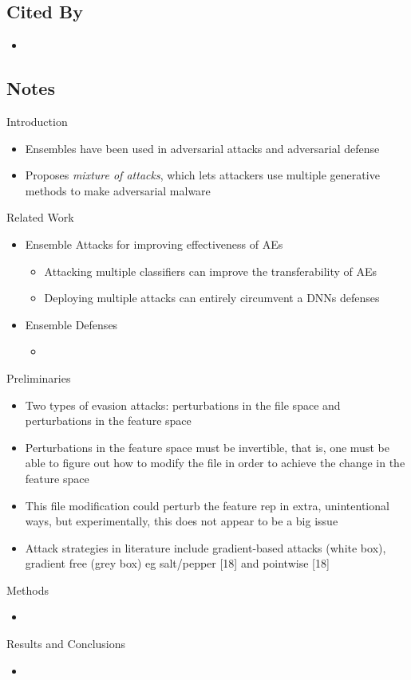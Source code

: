 \documentclass{article}
\begin{document}
\subsection*{Cited By}
\begin{itemize}
\item
\end{itemize}

\subsection*{Notes}

Introduction
\begin{itemize}
\item Ensembles have been used in adversarial attacks and adversarial defense
\item Proposes \textit{mixture of attacks}, which lets attackers use multiple generative methods to make adversarial malware
\end{itemize}
Related Work
\begin{itemize}
\item Ensemble Attacks for improving effectiveness of AEs
	\begin{itemize}
	\item Attacking multiple classifiers can improve the transferability of AEs
	\item Deploying multiple attacks can entirely circumvent a DNNs defenses
	\end{itemize}
\item Ensemble Defenses
	\begin{itemize}
	\item 
	\end{itemize}
\end{itemize}
Preliminaries
\begin{itemize}
\item Two types of evasion attacks: perturbations in the file space and perturbations in the feature space
\item Perturbations in the feature space must be invertible, that is, one must be able to figure out how to modify the file in order to achieve the change in the feature space
\item This file modification could perturb the feature rep in extra, unintentional ways, but experimentally, this does not appear to be a big issue
\item Attack strategies in literature include gradient-based attacks (white box), gradient free (grey box) eg salt/pepper [18] and pointwise [18]
\end{itemize}
Methods
\begin{itemize}
\item
\end{itemize}
Results and Conclusions
\begin{itemize}
\item
\end{itemize}
\pagebreak
\end{document}
